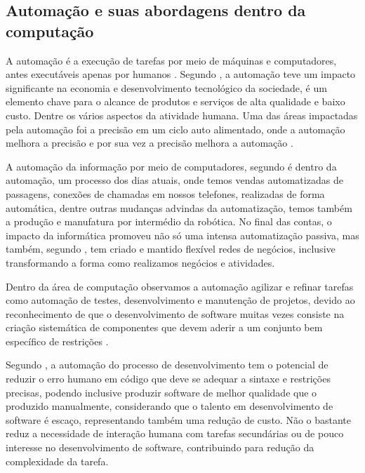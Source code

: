 \documentclass[12pt]{article}
\begin{document}


	\subsection{Automação e suas abordagens dentro da computação}
	
	A automação é a execução de tarefas por meio de máquinas e computadores, antes executáveis apenas por humanos \cite{automationlevels}.	Segundo \citeauthor{automation2009} \cite[pág. 124]{automation2009}, a automação teve um impacto significante na economia e desenvolvimento tecnológico da sociedade, é um elemento chave para o alcance de produtos e serviços de alta qualidade e baixo custo. Dentre os vários aspectos da atividade humana. Uma das áreas impactadas pela automação foi a precisão em um ciclo auto alimentado, onde a automação melhora a precisão e por sua vez a precisão melhora a automação \cite{auto2008precision}.
	
	A automação da informação por meio de computadores, segundo \citeauthor{automation2009} \cite[pág. 3]{automation2009} é dentro da automação, um processo dos dias atuais, onde temos vendas automatizadas de passagens, conexões de chamadas em nossos telefones, realizadas de forma automática, dentre outras mudanças advindas da automatização, temos também a produção e manufatura por intermédio da robótica. No final das contas, o impacto da informática promoveu não só uma intensa automatização passiva, mas também, segundo \citeauthor{itEnabledBusiness}\cite{itEnabledBusiness}, tem criado e mantido flexível redes de negócios, inclusive transformando a forma como realizamos negócios e atividades.
	
	Dentro da área de computação observamos a automação agilizar e refinar tarefas como automação de testes, desenvolvimento e manutenção de projetos, devido ao reconhecimento de que o desenvolvimento de software muitas vezes consiste na criação sistemática de componentes que devem aderir a um conjunto bem específico de restrições \cite{automionSoftEvolutionEffect}.
	
	Segundo \citeauthor{automionSoftEvolutionEffect}\cite{automionSoftEvolutionEffect}, a automação do processo de desenvolvimento tem o potencial de reduzir o erro humano em código que deve se adequar a sintaxe e restrições precisas, podendo inclusive produzir software de melhor qualidade que o produzido manualmente, considerando que o talento em desenvolvimento de software é escaço, representando também uma redução de custo. Não o bastante reduz a necessidade de interação humana com tarefas secundárias ou de pouco interesse no desenvolvimento de software, contribuindo para redução da complexidade da tarefa.
	
\end{document}

